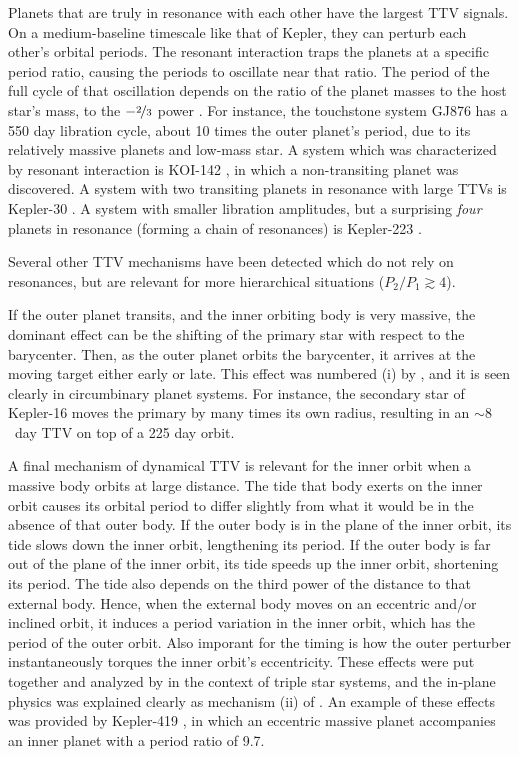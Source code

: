 \documentclass[graybox,natbib,nosecnum]{svmult}
\begin{document}
Planets that are truly in resonance with each other have the largest TTV signals.  On a medium-baseline timescale like that of Kepler, they can perturb each other's orbital periods.  The resonant interaction traps the planets at a specific period ratio, causing the periods to oscillate near that ratio.  The period of the full cycle of that oscillation depends on the ratio of the planet masses to the host star's mass, to the $-\nicefrac{2}{3}$ power \citep{2005MNRAS.359..567A,2016ApJ...823...72N}.  For instance, the touchstone system GJ876 has a 550 day libration cycle, about 10 times the outer planet's period, due to its relatively massive planets and low-mass star.  A system which was characterized by resonant interaction is KOI-142 \citep{2013ApJ...777....3N}, in which a non-transiting planet was discovered.   A system with two transiting planets in resonance with large TTVs is Kepler-30 \citep{2012ApJ...750..114F}.  A system with smaller libration amplitudes, but a surprising \emph{four} planets in resonance (forming a chain of resonances) is Kepler-223 \citep{2016Natur.533..509M}.

Several other TTV mechanisms have been detected which do not rely on resonances, but are relevant for more hierarchical situations ($P_2/P_1 \gtrsim 4$). 

If the outer planet transits, and the inner orbiting body is very massive, the dominant effect can be the shifting of the primary star with respect to the barycenter.   Then, as the outer planet orbits the barycenter, it arrives at the moving target either early or late.  This effect was numbered (i) by \cite{2005MNRAS.359..567A}, and it is seen clearly in circumbinary planet systems.  For instance, the secondary star of Kepler-16 \citep{2011Sci...333.1602D} moves the primary by many times its own radius, resulting in an $\sim 8$~day TTV on top of a 225 day orbit. 

A final mechanism of dynamical TTV is relevant for the inner orbit when a massive body orbits at large distance.  The tide that body exerts on the inner orbit causes its orbital period to differ slightly from what it would be in the absence of that outer body.  If the outer body is in the plane of the inner orbit, its tide slows down the inner orbit, lengthening its period.  If the outer body is far out of the plane of the inner orbit, its tide speeds up the inner orbit, shortening its period.  The tide also depends on the third power of the distance to that external body.  Hence, when the external body moves on an eccentric and/or inclined orbit, it induces a period variation in the inner orbit, which has the period of the outer orbit.  Also imporant for the timing is how the outer perturber instantaneously torques the inner orbit's eccentricity.  These effects were put together and analyzed by \cite{2003A&A...398.1091B} in the context of triple star systems, and the in-plane physics was explained clearly as mechanism (ii) of \cite{2005MNRAS.359..567A}.  An example of these effects was provided by Kepler-419 \citep{2014ApJ...791...89D}, in which an eccentric massive planet accompanies an inner planet with a period ratio of 9.7.
\end{document}
